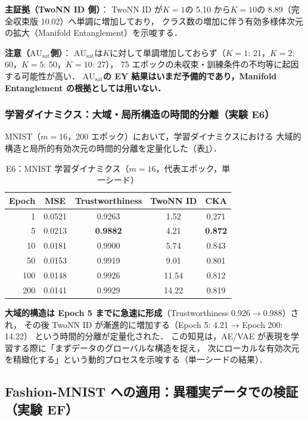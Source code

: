 \documentclass[11pt,a4paper]{jsarticle}
\newcommand{\AUsat}{\mathrm{AU}_{\mathrm{sat}}}
\begin{document}
\textbf{主証拠（TwoNN ID 側）}：
TwoNN ID が$K = 1$の 5.10 から$K = 10$の 8.89（完全収束版 10.02）へ単調に増加しており，
クラス数の増加に伴う有効多様体次元の拡大（Manifold Entanglement）を示唆する．

\textbf{注意（$\AUsat$側）}：
$\AUsat$は$K$に対して単調増加しておらず（$K=1$: 21，$K=2$: 60，$K=5$: 50，$K=10$: 27），
75 エポックの未収束・訓練条件の不均等に起因する可能性が高い．
\textbf{$\AUsat$の EY 結果はいまだ予備的であり，Manifold Entanglement の根拠としては用いない．}

\subsubsection{学習ダイナミクス：大域・局所構造の時間的分離（実験 E6）}

MNIST（$m = 16$，200 エポック）において，学習ダイナミクスにおける
大域的構造と局所的有効次元の時間的分離を定量化した（表\ref{tab:e6}）．

\begin{table}[H]
\centering
\caption{E6：MNIST 学習ダイナミクス（$m=16$，代表エポック，単一シード）}
\label{tab:e6}
\small
\begin{tabular}{rcccc}
\toprule
Epoch & MSE & Trustworthiness & TwoNN ID & CKA \\
\midrule
1   & 0.0521 & 0.9263 & 1.52 & 0.271 \\
5   & 0.0213 & \textbf{0.9882} & 4.21 & \textbf{0.872} \\
10  & 0.0181 & 0.9900 & 5.74 & 0.843 \\
50  & 0.0153 & 0.9919 & 9.01 & 0.801 \\
100 & 0.0148 & 0.9926 & 11.54 & 0.812 \\
200 & 0.0141 & 0.9929 & 14.22 & 0.819 \\
\bottomrule
\end{tabular}
\end{table}

\textbf{大域的構造は Epoch 5 までに急速に形成}（Trustworthiness $0.926 \to 0.988$）され，
その後 TwoNN ID が漸進的に増加する（Epoch 5: 4.21 → Epoch 200: 14.22）
という時間的分離が定量化された．
この知見は，AE/VAE が表現を学習する際に「まずデータのグローバルな構造を捉え，
次にローカルな有効次元を精緻化する」という動的プロセスを示唆する（単一シードの結果）．

\subsection{Fashion-MNIST への適用：異種実データでの検証（実験 EF）}\label{sec:exp_fashion}
\end{document}
